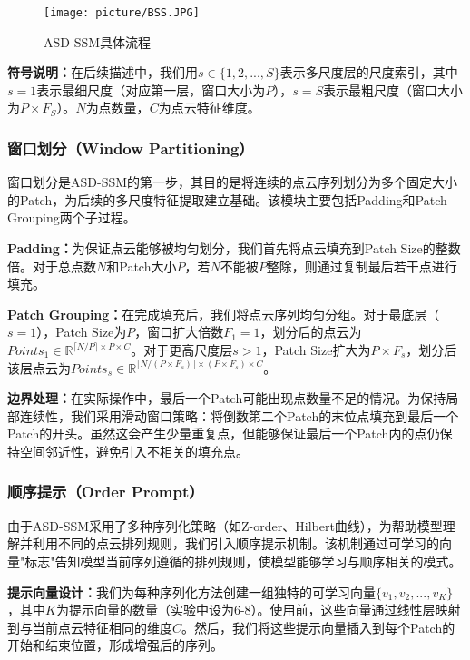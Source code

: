 \documentclass[preprint,12pt]{elsarticle}
\begin{document}
\begin{figure}[htbp]
	\centering
	\texttt{[image: picture/BSS.JPG]}
	\caption{ASD-SSM具体流程}
	\label{fig:bss}
\end{figure}


\textbf{符号说明：}在后续描述中，我们用$s \in \{1, 2, ..., S\}$表示多尺度层的尺度索引，其中$s=1$表示最细尺度（对应第一层，窗口大小为$P$），$s=S$表示最粗尺度（窗口大小为$P \times F_S$）。$N$为点数量，$C$为点云特征维度。


\subsubsection{窗口划分（Window Partitioning）}

窗口划分是ASD-SSM的第一步，其目的是将连续的点云序列划分为多个固定大小的Patch，为后续的多尺度特征提取建立基础。该模块主要包括Padding和Patch Grouping两个子过程。

\textbf{Padding：}为保证点云能够被均匀划分，我们首先将点云填充到Patch Size的整数倍。对于总点数$N$和Patch大小$P$，若$N$不能被$P$整除，则通过复制最后若干点进行填充。

\textbf{Patch Grouping：}在完成填充后，我们将点云序列均匀分组。对于最底层（$s=1$），Patch Size为$P$，窗口扩大倍数$F_1=1$，划分后的点云为$Points_1\in\mathbb{R}^{\lceil N/P \rceil\times P \times C}$。对于更高尺度层$s>1$，Patch Size扩大为$P\times F_s$，划分后该层点云为$Points_s\in\mathbb{R}^{\lceil N/(P\times F_s) \rceil\times (P\times F_s) \times C}$。

\textbf{边界处理：}在实际操作中，最后一个Patch可能出现点数量不足的情况。为保持局部连续性，我们采用滑动窗口策略：将倒数第二个Patch的末位点填充到最后一个Patch的开头。虽然这会产生少量重复点，但能够保证最后一个Patch内的点仍保持空间邻近性，避免引入不相关的填充点。


\subsubsection{顺序提示（Order Prompt）}

由于ASD-SSM采用了多种序列化策略（如Z-order、Hilbert曲线），为帮助模型理解并利用不同的点云排列规则，我们引入顺序提示机制。该机制通过可学习的向量"标志"告知模型当前序列遵循的排列规则，使模型能够学习与顺序相关的模式。

\textbf{提示向量设计：}我们为每种序列化方法创建一组独特的可学习向量$\{v_1, v_2, ..., v_K\}$，其中$K$为提示向量的数量（实验中设为6-8）。使用前，这些向量通过线性层映射到与当前点云特征相同的维度$C$。然后，我们将这些提示向量插入到每个Patch的开始和结束位置，形成增强后的序列。
\end{document}
